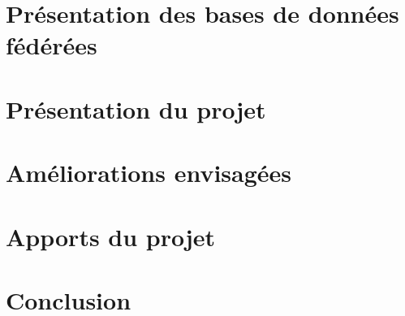 \documentclass[10pt,a4paper]{report}
\begin{document}
\chapter{Présentation des bases de données fédérées}
\label{chapterI}


\chapter{Présentation du projet}


\chapter{Améliorations envisagées}


\chapter{Apports du projet}


\chapter*{Conclusion}


\appendix




\end{document}
